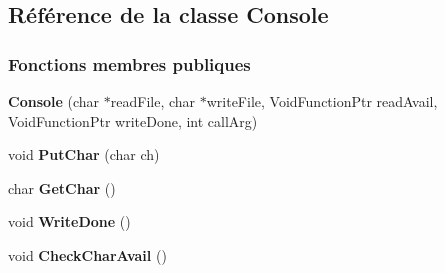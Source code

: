 \hypertarget{class_console}{}\subsection{Référence de la classe Console}
\label{class_console}
\subsubsection*{Fonctions membres publiques}
\begin{DoxyCompactItemize}
\item 
\hypertarget{class_console_a406c2b2b53d474272656d7ec934b7235}{}\label{class_console_a406c2b2b53d474272656d7ec934b7235} 
{\bfseries Console} (char $\ast$read\+File, char $\ast$write\+File, Void\+Function\+Ptr read\+Avail, Void\+Function\+Ptr write\+Done, int call\+Arg)
\item 
\hypertarget{class_console_af4828702d63f7f144e8d17395471b59f}{}\label{class_console_af4828702d63f7f144e8d17395471b59f} 
void {\bfseries Put\+Char} (char ch)
\item 
\hypertarget{class_console_aee2f18e347f92c0a1f3d8a4b86b024d9}{}\label{class_console_aee2f18e347f92c0a1f3d8a4b86b024d9} 
char {\bfseries Get\+Char} ()
\item 
\hypertarget{class_console_a8a611e74235a39a9b7216b6d66e32c30}{}\label{class_console_a8a611e74235a39a9b7216b6d66e32c30} 
void {\bfseries Write\+Done} ()
\item 
\hypertarget{class_console_a099797597b7bd0b349518aac215fcb2f}{}\label{class_console_a099797597b7bd0b349518aac215fcb2f} 
void {\bfseries Check\+Char\+Avail} ()
\end{DoxyCompactItemize}
